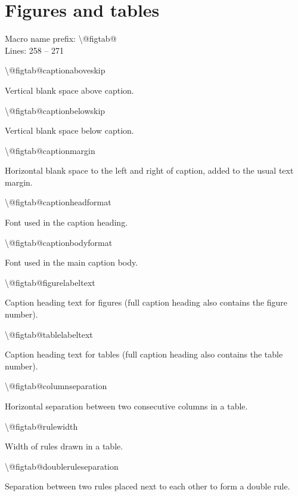 \documentclass[twoside,openany]{thesis}
\begin{document}
\section{Figures and tables}\label{sec:Figures and tables}

Macro name prefix: {\ttfamily\textbackslash @figtab@}\\
Lines: 258 -- 271

\begin{listing}

\item   {\ttfamily\textbackslash @figtab@captionaboveskip}

        Vertical blank space above caption.

\item   {\ttfamily\textbackslash @figtab@captionbelowskip}

        Vertical blank space below caption.

\item   {\ttfamily\textbackslash @figtab@captionmargin}

        Horizontal blank space to the left and right of caption, added to the usual text margin.

\item   {\ttfamily\textbackslash @figtab@captionheadformat}

        Font used in the caption heading.

\item   {\ttfamily\textbackslash @figtab@captionbodyformat}

        Font used in the main caption body.

\item   {\ttfamily\textbackslash @figtab@figurelabeltext}

        Caption heading text for figures (full caption heading also contains the figure number).

\item   {\ttfamily\textbackslash @figtab@tablelabeltext}

        Caption heading text for tables (full caption heading also contains the table number).

\item   {\ttfamily\textbackslash @figtab@columnseparation}

        Horizontal separation between two consecutive columns in a table.

\item   {\ttfamily\textbackslash @figtab@rulewidth}

        Width of rules drawn in a table.

\item   {\ttfamily\textbackslash @figtab@doubleruleseparation}

        Separation between two rules placed next to each other to form a double rule.

\end{listing}
\end{document}
